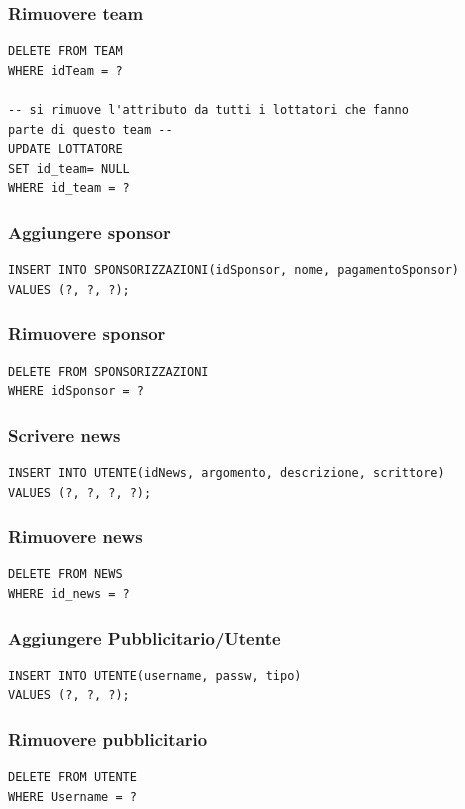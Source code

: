\documentclass[a4paper,12pt]{report}
\begin{document}
\subsubsection{Rimuovere team}
\begin{verbatim}
DELETE FROM TEAM 
WHERE idTeam = ?

-- si rimuove l'attributo da tutti i lottatori che fanno 
parte di questo team --
UPDATE LOTTATORE
SET id_team= NULL
WHERE id_team = ?
\end{verbatim}
\subsubsection{Aggiungere sponsor}
\begin{verbatim}
INSERT INTO SPONSORIZZAZIONI(idSponsor, nome, pagamentoSponsor)
VALUES (?, ?, ?);
\end{verbatim}
\subsubsection{Rimuovere sponsor}
\begin{verbatim}
DELETE FROM SPONSORIZZAZIONI
WHERE idSponsor = ?
\end{verbatim}
\subsubsection{Scrivere news}
\begin{verbatim}
INSERT INTO UTENTE(idNews, argomento, descrizione, scrittore)
VALUES (?, ?, ?, ?);
\end{verbatim}
\subsubsection{Rimuovere news}
\begin{verbatim}
DELETE FROM NEWS
WHERE id_news = ?
\end{verbatim}
\subsubsection{Aggiungere Pubblicitario/Utente}
\begin{verbatim}
INSERT INTO UTENTE(username, passw, tipo)
VALUES (?, ?, ?);
\end{verbatim}
\subsubsection{Rimuovere pubblicitario}
\begin{verbatim}
DELETE FROM UTENTE
WHERE Username = ?
\end{verbatim}
\end{document}
